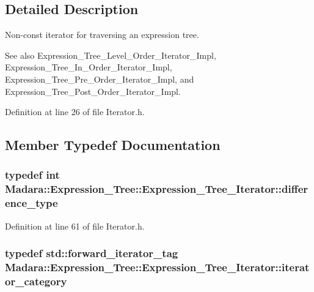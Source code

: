 \subsection{Detailed Description}
Non-\/const iterator for traversing an expression tree. \begin{DoxySeeAlso}{See also}
Expression\_\-Tree\_\-Level\_\-Order\_\-Iterator\_\-Impl, Expression\_\-Tree\_\-In\_\-Order\_\-Iterator\_\-Impl, Expression\_\-Tree\_\-Pre\_\-Order\_\-Iterator\_\-Impl, and Expression\_\-Tree\_\-Post\_\-Order\_\-Iterator\_\-Impl. 
\end{DoxySeeAlso}


Definition at line 26 of file Iterator.h.



\subsection{Member Typedef Documentation}
\hypertarget{classMadara_1_1Expression__Tree_1_1Expression__Tree__Iterator_af4d5c194cee2cdeef60ab7423e2b203e}{
\subsubsection[{difference\_\-type}]{\setlength{\rightskip}{0pt plus 5cm}typedef int {\bf Madara::Expression\_\-Tree::Expression\_\-Tree\_\-Iterator::difference\_\-type}}}
\label{d2/d83/classMadara_1_1Expression__Tree_1_1Expression__Tree__Iterator_af4d5c194cee2cdeef60ab7423e2b203e}


Definition at line 61 of file Iterator.h.

\hypertarget{classMadara_1_1Expression__Tree_1_1Expression__Tree__Iterator_aa573fce576caef4290f0b8d3719dcac1}{
\subsubsection[{iterator\_\-category}]{\setlength{\rightskip}{0pt plus 5cm}typedef std::forward\_\-iterator\_\-tag {\bf Madara::Expression\_\-Tree::Expression\_\-Tree\_\-Iterator::iterator\_\-category}}}
\label{d2/d83/classMadara_1_1Expression__Tree_1_1Expression__Tree__Iterator_aa573fce576caef4290f0b8d3719dcac1}


